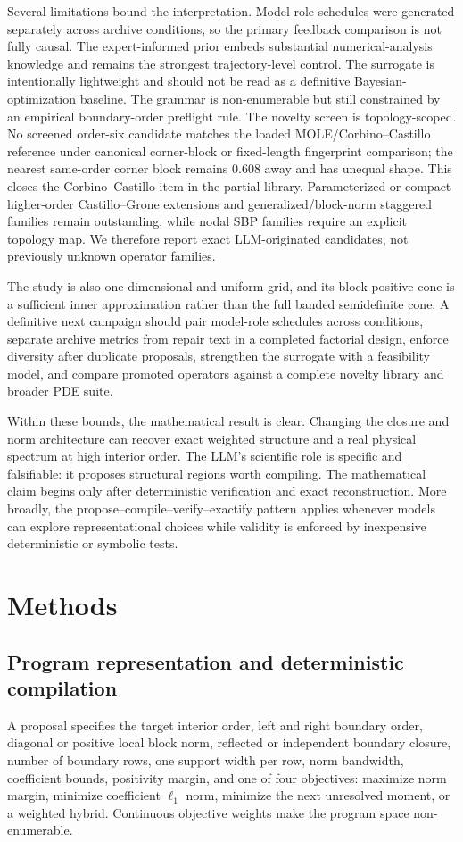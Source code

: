 \documentclass[lineno,pdflatex,sn-nature]{sn-jnl}
\theoremstyle{thmstyleone}
\begin{document}
Several limitations bound the interpretation. Model-role schedules were generated separately across archive conditions, so the primary feedback comparison is not fully causal. The expert-informed prior embeds substantial numerical-analysis knowledge and remains the strongest trajectory-level control. The surrogate is intentionally lightweight and should not be read as a definitive Bayesian-optimization baseline. The grammar is non-enumerable but still constrained by an empirical boundary-order preflight rule. The novelty screen is topology-scoped. No screened order-six candidate matches the loaded MOLE/Corbino--Castillo reference under canonical corner-block or fixed-length fingerprint comparison; the nearest same-order corner block remains 0.608 away and has unequal shape. This closes the Corbino--Castillo item in the partial library. Parameterized or compact higher-order Castillo--Grone extensions and generalized/block-norm staggered families remain outstanding, while nodal SBP families require an explicit topology map. We therefore report exact LLM-originated candidates, not previously unknown operator families.

The study is also one-dimensional and uniform-grid, and its block-positive cone is a sufficient inner approximation rather than the full banded semidefinite cone. A definitive next campaign should pair model-role schedules across conditions, separate archive metrics from repair text in a completed factorial design, enforce diversity after duplicate proposals, strengthen the surrogate with a feasibility model, and compare promoted operators against a complete novelty library and broader PDE suite.

Within these bounds, the mathematical result is clear. Changing the closure and norm architecture can recover exact weighted structure and a real physical spectrum at high interior order. The LLM's scientific role is specific and falsifiable: it proposes structural regions worth compiling. The mathematical claim begins only after deterministic verification and exact reconstruction. More broadly, the propose--compile--verify--exactify pattern applies whenever models can explore representational choices while validity is enforced by inexpensive deterministic or symbolic tests.

\section{Methods}
\subsection{Program representation and deterministic compilation}
A proposal specifies the target interior order, left and right boundary order, diagonal or positive local block norm, reflected or independent boundary closure, number of boundary rows, one support width per row, norm bandwidth, coefficient bounds, positivity margin, and one of four objectives: maximize norm margin, minimize coefficient $\ell_1$ norm, minimize the next unresolved moment, or a weighted hybrid. Continuous objective weights make the program space non-enumerable.
\end{document}
